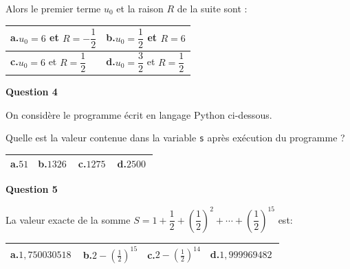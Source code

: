 \documentclass[10pt]{article}
\providecommand{\np}[2][]{{#2~#1}}
\begin{document}
Alors le premier terme $u_0$ et la raison $R$ de la suite sont :

\begin{center}
{\renewcommand{\arraystretch}{1}
\begin{tabularx}{0.8\linewidth}{|X|X|}
\hline
\textbf{a.}\quad $u_0=6$ et $R=-\dfrac{1}{2}$ \rule[-10pt]{0pt}{27pt}& \textbf{b.}\quad $u_0=\dfrac{1}{2}$ et $R=6$ \\
\hline
\textbf{c.}\quad $u_0=6$ et $R=\dfrac{1}{2}$  \rule[-10pt]{0pt}{27pt} & \textbf{d.}\quad $u_0=\dfrac{3}{2}$ et $R=\dfrac{1}{2}$\\
\hline
\end{tabularx}}
\end{center}

\medskip

\textbf{Question 4}

\medskip

On considère le programme écrit en langage Python ci-dessous.

\begin{center}
\end{center}

Quelle est la valeur contenue dans la variable \texttt{s} après exécution du programme ?

\begin{center}
{\renewcommand{\arraystretch}{1.5}
\begin{tabularx}{\linewidth}{|X|X|X|X|}
\hline
\textbf{a.}\quad $51$ & \textbf{b.}\quad $\np{1326}$ 
& \textbf{c.}\quad $\np{1275}$   & \textbf{d.}\quad $\np{2500}$\\
\hline
\end{tabularx}}
\end{center}

\medskip

\textbf{Question 5}

\medskip

La valeur exacte de la somme  $S= 1+ \dfrac{1}{2} + \left (\dfrac{1}{2}\right )^2 + \cdots + \left ( \dfrac{1}{2}\right )^{15}$ est:

\begin{center}
{\renewcommand{\arraystretch}{1.7}
\begin{tabularx}{\linewidth}{|X|X|X|X|}
\hline
\textbf{a.}\quad $\np{1,750030518}$ & \textbf{b.}\quad $2 - \left ( \frac{1}{2}\right )^{15}$ 
& \textbf{c.}\quad $2 - \left ( \frac{1}{2}\right )^{14}$   & \textbf{d.}\quad $\np{1,999969482}$\\
\hline
\end{tabularx}}
\end{center}
\end{document}
